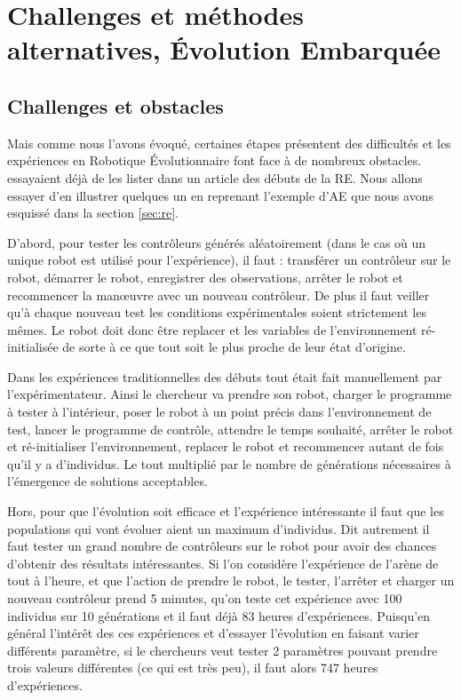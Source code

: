 \section{Challenges et méthodes alternatives, \'Evolution Embarquée}\label{sec:RE:EE}
\subsection{Challenges et obstacles}\label{sec:RE:EE:obs}
Mais comme nous l'avons évoqué, certaines étapes présentent des difficultés et les expériences en Robotique \'Evolutionnaire font face à de nombreux obstacles. \cite{mataric96challengesinevolvingcontrollersforphysicalrobots} essayaient déjà de les lister dans un article des débuts de la RE. Nous allons essayer d'en illustrer quelques un en reprenant l'exemple d'AE que nous avons esquissé dans la section \ref{sec:re}.

D'abord, pour tester les contrôleurs générés aléatoirement (dans le cas où un unique robot est utilisé pour l'expérience), il faut : transférer un contrôleur sur le robot, démarrer le robot, enregistrer des observations, arrêter le robot et recommencer la manœuvre avec un nouveau contrôleur. De plus il faut veiller qu'à chaque nouveau test les conditions expérimentales soient strictement les mêmes. Le robot doit donc être replacer et les variables de l'environnement ré-initialisée de sorte à ce que tout soit le plus proche de leur état d'origine.

Dans les expériences traditionnelles des débuts tout était fait manuellement par l'expérimentateur. Ainsi le chercheur va prendre son robot, charger le programme à tester à l'intérieur, poser le robot à un point précis dans l'environnement de test, lancer le programme de contrôle, attendre le temps souhaité, arrêter le robot et ré-initialiser l'environnement, replacer le robot et recommencer autant de fois qu'il y a d'individus. Le tout multiplié par le nombre de générations nécessaires à l'émergence de solutions acceptables. 

Hors, pour que l'évolution soit efficace et l'expérience intéressante il faut que les populations qui vont évoluer aient un maximum d'individus. Dit autrement il faut tester un grand nombre de contrôleurs sur le robot pour avoir des chances d'obtenir des résultats intéressantes. Si l'on considère l'expérience de l'arène de tout à l'heure, et que l'action de prendre le robot, le tester, l'arrêter et charger un nouveau contrôleur prend 5 minutes, qu'on teste cet expérience avec 100 individus sur 10 générations et il faut déjà 83 heures d'expériences. Puisqu'en général l'intérêt des ces expériences et d'essayer l'évolution en faisant varier différents paramètre, si le chercheurs veut tester 2 paramètres pouvant prendre trois valeurs différentes (ce qui est très peu), il faut alors 747 heures d'expériences.

